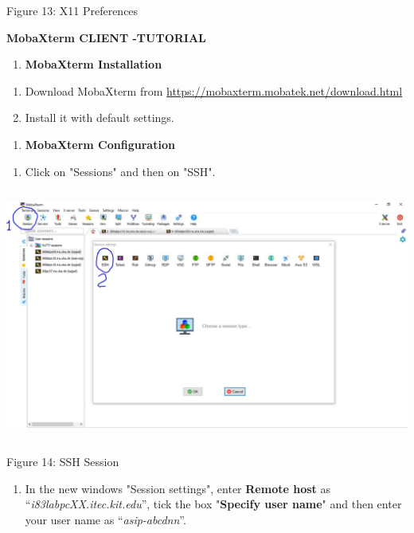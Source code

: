 \documentclass{article}
\begin{document}
Figure 13: X11 Preferences

\textbf{\hfill\break
}

\textbf{MobaXterm CLIENT -TUTORIAL}

\begin{enumerate}
\def\labelenumi{\Alph{enumi}.}
\setcounter{enumi}{6}
\item
  \textbf{MobaXterm Installation}
\end{enumerate}

\begin{enumerate}
\def\labelenumi{\arabic{enumi}.}
\item
  Download MobaXterm from
  \url{https://mobaxterm.mobatek.net/download.html}
\item
  Install it with default settings.
\end{enumerate}

\begin{enumerate}
\def\labelenumi{\Alph{enumi}.}
\setcounter{enumi}{7}
\item
  \textbf{MobaXterm Configuration}
\end{enumerate}

\begin{enumerate}
\def\labelenumi{\arabic{enumi}.}
\setcounter{enumi}{2}
\item
  Click on "Sessions" and then on "SSH".
\end{enumerate}

\includegraphics[width=5.73515in,height=3.25226in]{images/media/image14.JPG}

Figure 14: SSH Session

\begin{enumerate}
\def\labelenumi{\arabic{enumi}.}
\setcounter{enumi}{3}
\item
  In the new windows "Session settings", enter \textbf{Remote host} as
  ``\emph{i83labpcXX.itec.kit.edu}'', tick the box "\textbf{Specify user
  name}" and then enter your user name as ``\emph{asip-abcdnn}''.
\end{enumerate}
\end{document}
